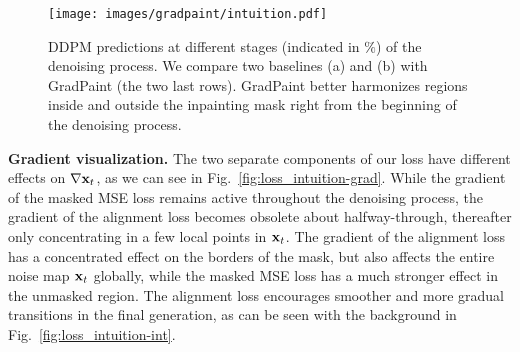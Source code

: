 \begin{figure}[htbp]
  \centering
    \texttt{[image: images/gradpaint/intuition.pdf]}
    \caption{DDPM predictions at different stages (indicated in $\%$) of the denoising process. We compare two baselines (a) and (b) with GradPaint (the two last rows). GradPaint better harmonizes regions inside and outside the inpainting mask right from the beginning of the denoising process.}
    \label{fig:intuition}
\end{figure}

\noindent \textbf{Gradient visualization.} The two separate components of our loss have different effects on $\nabla{\mathbf{x}_t}$, as we can see in Fig.~\ref{fig:loss_intuition-grad}.  While the gradient of the masked MSE loss remains active throughout the denoising process, the gradient of the alignment loss becomes obsolete about halfway-through, thereafter only concentrating in a few local points in $\mathbf{x}_t$. The gradient of the alignment loss has a concentrated effect on the borders of the mask, but also affects the entire noise map $\mathbf{x}_t$ globally, while the masked MSE loss has a much stronger effect in the unmasked region. The alignment loss encourages smoother and more gradual transitions in the final generation, as can be seen with the background in Fig.~\ref{fig:loss_intuition-int}. 





